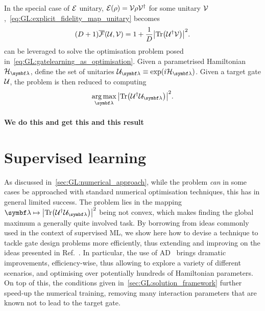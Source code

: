 In the special case of ${\mathcal{E}}$ unitary, ${\mathcal{E}}(\rho)={\mathcal{V}}\rho {\mathcal{V}}^\dagger$ for some unitary ${\mathcal{V}}$,~\cref{eq:GL:explicit_fidelity_map_unitary} becomes
\begin{equation}
    (D+1) \overline{{\mathcal{F}}}({\mathcal{U}}, {\mathcal{V}}) =
    1 + \frac{1}{D} \abs{\Tr({\mathcal{U}}^\dagger {\mathcal{V}})}^2.
    \label{eq:GL:explicit_fidelity_unitary_unitary}
\end{equation}
 can be leveraged to solve the optimisation problem posed in~\cref{eq:GL:gatelearning_as_optimisation}.
Given a parametrised Hamiltonian $\calH_{\bslambda}$, define the set of unitaries $\calU_{\bslambda}\equiv\exponential(i\calH_{\bslambda})$. Given a target gate ${\mathcal{U}}$, the problem is then reduced to computing
\begin{equation}
    \argmax_{\bslambda} \abs{\Tr(\calU^\dagger \calU_{\bslambda})}^2.
\end{equation}

\paragraph{We do this and get this and this result}




\section{Supervised learning}
\label{sec:GL:supervised_learning}

As discussed in~\cref{sec:GL:numerical_approach}, while the problem \emph{can} in some cases be approached with standard numerical optimisation techniques, this has in general limited success.
The problem lies in the mapping $\bslambda\mapsto\abs{\Tr(\calU^\dagger \calU_{\bslambda})}^2$ being not convex, which makes finding the global maximum a generally quite involved task.
By borrowing from ideas commonly used in the context of supervised \ac{ML}, we show here how to devise a technique to tackle gate design problems more efficiently, thus extending and improving on the ideas presented in Ref.~\cite{banchi2016quantum}.
In particular, the use of \ac{AD}~\cite{baydin2018automatic,bartholomewbiggs2000automatic,wengert1964a,bischof2008advances} brings dramatic improvements, efficiency-wise, thus allowing to explore a variety of different scenarios, and optimising over potentially hundreds of Hamiltonian parameters.
On top of this, the conditions given in~\cref{sec:GL:solution_framework} further speed-up the numerical training, removing many interaction parameters that are known not to lead to the target gate.

